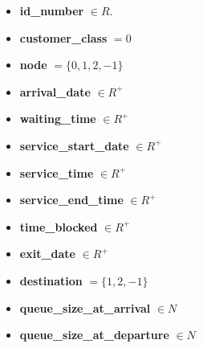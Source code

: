 \begin{multicols}{2}
    \begin{itemize}
        \item \textbf{id\_number} \(\in R\).
        \item \textbf{customer\_class} \(= 0\)
        \item \textbf{node} \(= \{0, 1, 2, -1 \} \)
        \item \textbf{arrival\_date} \( \in R^+ \)
        \item \textbf{waiting\_time} \( \in R^+ \)
        \item \textbf{service\_start\_date} \( \in R^+ \)
        \item \textbf{service\_time} \( \in R^+ \)
        \item \textbf{service\_end\_time} \( \in R^+ \)
        \item \textbf{time\_blocked} \( \in R^+ \)
        \item \textbf{exit\_date} \( \in R^+ \)
        \item \textbf{destination} \( = \{1, 2, -1\} \)
        \item \textbf{queue\_size\_at\_arrival} \( \in N \)
        \item \textbf{queue\_size\_at\_departure} \( \in N \)
    \end{itemize}
\end{multicols}
